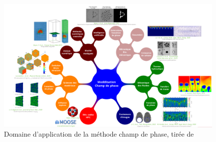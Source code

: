 \begin{figure}[H]
	\centering
	\includegraphics[width=0.9\linewidth]{figure/champ_phase}
	\caption[Domaine d'application de la méthode champ de phase]{Domaine d'application de la méthode champ de phase, tirée de \cite{introini_suivi_nodate}}
	\label{fig:champphase}
\end{figure} 
